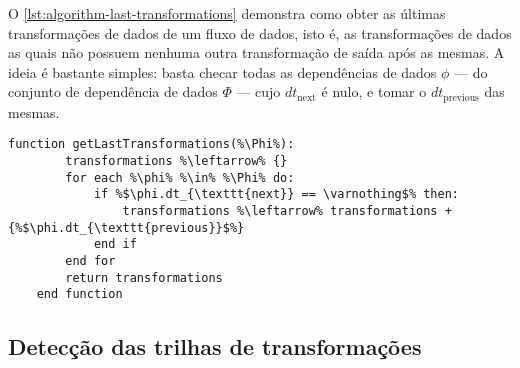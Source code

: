 O \autoref{lst:algorithm-last-transformations} demonstra como obter as últimas transformações de dados de um fluxo de dados, isto é, as transformações de dados as quais não possuem nenhuma outra transformação de saída após as mesmas. A ideia é bastante simples: basta checar todas as dependências de dados \( \phi \) --- do conjunto de dependência de dados \( \Phi \) --- cujo \( dt_{\textrm{next}} \) é nulo, e tomar o \( dt_{\textrm{previous}} \) das mesmas.



\begin{lstlisting}[language=pseudocode,label={lst:algorithm-last-transformations},caption={[Detecção das últimas transformações de dados]Detecção das útimas transformações de dados em uma especificação de fluxo de dados.}]
    function getLastTransformations(%\Phi%):
        transformations %\leftarrow% {}
        for each %\phi% %\in% %\Phi% do:
            if %$\phi.dt_{\texttt{next}} == \varnothing$% then:
                transformations %\leftarrow% transformations + {%$\phi.dt_{\texttt{previous}}$%}
            end if
        end for
        return transformations
    end function
\end{lstlisting}


\subsection{Detecção das trilhas de transformações}


